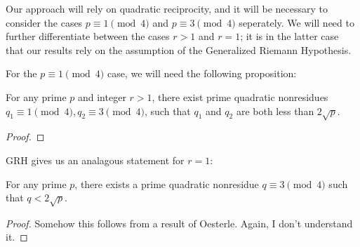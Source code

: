 \documentclass{amsart}
\begin{document}
Our approach will rely on quadratic reciprocity, and it will be
necessary to consider the cases $p \equiv 1 \pmod 4$ and $p \equiv 3
\pmod 4$ seperately. We will need to further differentiate between the
cases $r > 1$ and $r = 1$; it is in the latter case that our results
rely on the assumption of the Generalized Riemann Hypothesis.

For the $p \equiv 1 \pmod 4$ case, we will need the following
proposition:
\begin{prop}
  \label{prop:q_bound}
  For any prime $p$ and integer $r > 1$, there exist prime quadratic
  nonresidues $q_1 \equiv 1 \pmod 4, q_2 \equiv 3 \pmod 4$, such that
  $q_1$ and $q_2$ are both less than $2\sqrt{p}$.
\end{prop}
\begin{proof}

\end{proof}

GRH gives us an analagous statement for $r=1$:
\begin{prop}
  \label{prop:q_bound_grh}
  For any prime $p$, there exists a prime quadratic nonresidue $q
  \equiv 3 \pmod 4$ such that $q < 2\sqrt{p}$.
\end{prop}
\begin{proof}
  Somehow this follows from a result of Oesterle. Again, I don't
  understand it.
\end{proof}
\end{document}

